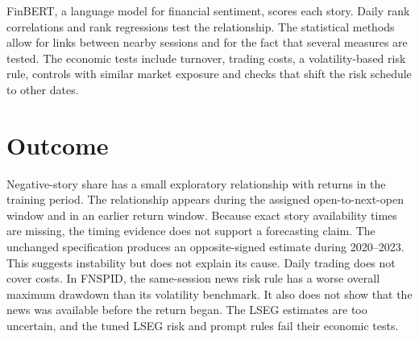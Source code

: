 FinBERT, a language model for financial sentiment, scores each story. Daily rank
correlations and rank regressions test the relationship. The statistical methods
allow for links between nearby sessions and for the fact that several measures
are tested. The economic tests include turnover, trading costs, a volatility-based
risk rule, controls with similar market exposure and checks that shift the risk
schedule to other dates.

\section*{Outcome}

Negative-story share has a small exploratory relationship with returns in the
training period. The relationship appears during the assigned open-to-next-open
window and in an earlier return window. Because exact story availability times
are missing, the timing evidence does not support a forecasting claim. The
unchanged specification produces an opposite-signed estimate during 2020--2023.
This suggests instability but does not explain its cause. Daily trading does not
cover costs. In FNSPID, the same-session news risk rule has a worse overall maximum
drawdown than its volatility benchmark. It also does not show that the news was
available before the return began. The LSEG estimates are too uncertain, and the
tuned LSEG risk and prompt rules fail their economic tests.
